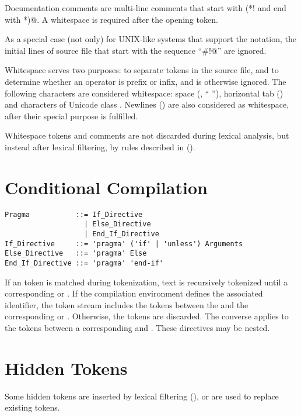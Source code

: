 Documentation comments are multi-line comments that start with \lstinline@(*! and end with *)@. A whitespace is required after the opening token. 

As a special case (not only) for UNIX-like systems that support the notation, the initial lines of source file that start with the sequence ``\lstinline@#!@'' are ignored. 

Whitespace serves two purposes: to separate tokens in the source file, and to determine whether an operator is prefix or infix, and is otherwise ignored. The following characters are considered whitespace: space (, `` ''), horizontal tab () and characters of Unicode class . Newlines () are also considered as whitespace, after their special purpose is fulfilled. 

Whitespace tokens and comments are not discarded during lexical analysis, but instead after lexical filtering, by rules described in ().





\section{Conditional Compilation}
\label{sec:conditional-compilation}

\grammar\begin{lstlisting}[deletekeywords={if,unless}]
Pragma           ::= If_Directive 
                   | Else_Directive 
                   | End_If_Directive 
If_Directive     ::= 'pragma' ('if' | 'unless') Arguments
Else_Directive   ::= 'pragma' Else
End_If_Directive ::= 'pragma' 'end-if'
\end{lstlisting}

If an  token is matched during tokenization, text is recursively tokenized until a corresponding  or . If the compilation environment defines the associated identifier, the token stream includes the tokens between the  and the corresponding  or . Otherwise, the tokens are discarded. The converse applies to the tokens between a corresponding  and . These directives may be nested. 





\section{Hidden Tokens}
\label{sec:hidden-tokens}

Some hidden tokens are inserted by lexical filtering (), or are used to replace existing tokens. 





